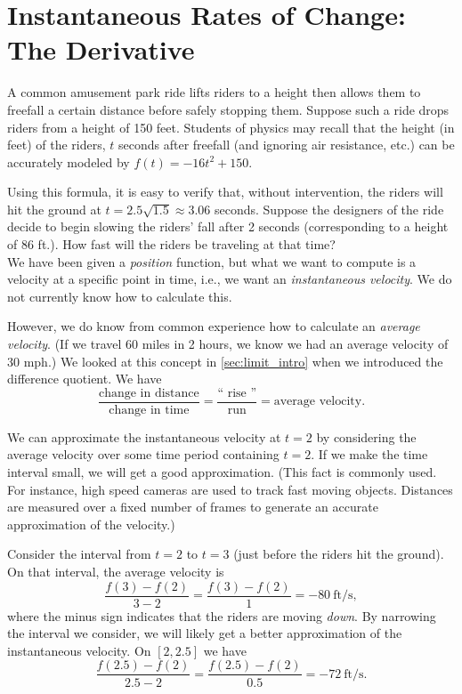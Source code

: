 \section{Instantaneous Rates of Change: The Derivative}\label{sec:derivative}

A common amusement park ride lifts riders to a height then allows them to freefall a certain distance before safely stopping them. Suppose such a ride drops riders from a height of 150 feet. Students of physics may recall that the height (in feet) of the riders, $t$ seconds after freefall (and ignoring air resistance, etc.) can be accurately modeled by $f(t) = -16t^2+150$. 

Using this formula, it is easy to verify that, without intervention, the riders will hit the ground at $t=2.5\sqrt{1.5} \approx 3.06$ seconds. Suppose the designers of the ride decide to begin slowing the riders' fall after 2 seconds (corresponding to a height of 86 ft.). How fast will the riders be traveling at that time?\\

We have been given a \textit{position} function, but what we want to compute is a velocity at a specific point in time, i.e., we want an \textit{instantaneous velocity}. We do not currently know how to calculate this.

However, we do know from common experience how to calculate an \textit{average velocity}. (If we travel 60 miles in 2 hours, we know we had an average velocity of 30 mph.) We looked at this concept in \autoref{sec:limit_intro} when we introduced the difference quotient. We have 
	\[\frac{\text{change in distance}}{\text{change in time}} = \frac{\text{``\ rise\ ''}}{\text{run}} = \text{average velocity}.\]
	
We can approximate the instantaneous velocity at $t=2$ by considering the average velocity over some time period containing $t=2$. If we make the time interval small, we will get a good approximation. (This fact is commonly used. For instance, high speed cameras are used to track fast moving objects. Distances are measured over a fixed number of frames to generate an accurate approximation of the velocity.)

Consider the interval from $t=2$ to $t=3$ (just before the riders hit the ground). On that interval, the average velocity is 
		\[\frac{f(3)-f(2)}{3-2} = \frac{f(3)-f(2)}{1} =-80\ \text{ft/s},\]
where the minus sign indicates that the riders are moving \textit{down}. By narrowing the interval we consider, we will likely get a better approximation of the instantaneous velocity. On $[2,2.5]$ we have 
	\[\frac{f(2.5)-f(2)}{2.5-2} = \frac{f(2.5)-f(2)}{0.5} =-72\ \text{ft/s}.\]

